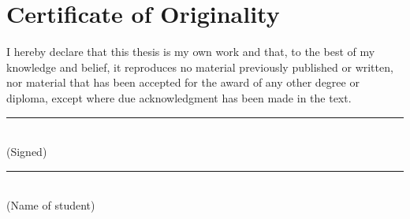 \section*{Certificate of Originality}

\vspace{5em}

I hereby declare that this thesis is my own work and that, to the best of my knowledge and belief, it reproduces no material previously published or written, nor material that has been accepted for the award of any other degree or diploma, except where due acknowledgment has been made in the text.

\vspace{5em}

\begin{flushright}
\begin{minipage}{20em}
\centering
\rule{\linewidth}{0.5pt}\\
(Signed)\\[3em]
\rule{\linewidth}{0.5pt}\\
(Name of student)
\end{minipage}
\end{flushright}

\vfill